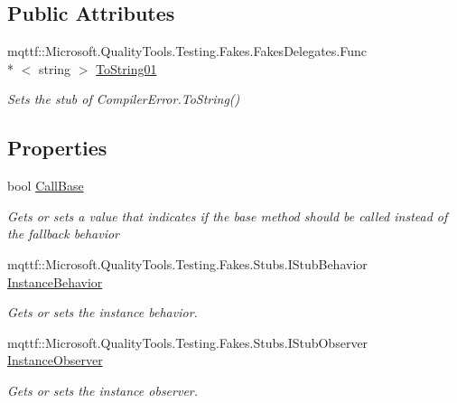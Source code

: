 \subsection*{Public Attributes}
\begin{DoxyCompactItemize}
\item 
mqttf\-::\-Microsoft.\-Quality\-Tools.\-Testing.\-Fakes.\-Fakes\-Delegates.\-Func\\*
$<$ string $>$ \hyperlink{class_system_1_1_code_dom_1_1_compiler_1_1_fakes_1_1_stub_compiler_error_adfee205dce906d7669120c94675a8c4e}{To\-String01}
\begin{DoxyCompactList}\small\item\em Sets the stub of Compiler\-Error.\-To\-String()\end{DoxyCompactList}\end{DoxyCompactItemize}
\subsection*{Properties}
\begin{DoxyCompactItemize}
\item 
bool \hyperlink{class_system_1_1_code_dom_1_1_compiler_1_1_fakes_1_1_stub_compiler_error_aa108fa830ceedfa9322638f34c5fa9ea}{Call\-Base}
\begin{DoxyCompactList}\small\item\em Gets or sets a value that indicates if the base method should be called instead of the fallback behavior\end{DoxyCompactList}\item 
mqttf\-::\-Microsoft.\-Quality\-Tools.\-Testing.\-Fakes.\-Stubs.\-I\-Stub\-Behavior \hyperlink{class_system_1_1_code_dom_1_1_compiler_1_1_fakes_1_1_stub_compiler_error_ab015a97eb6c6c8eb1ee63805430b3a48}{Instance\-Behavior}
\begin{DoxyCompactList}\small\item\em Gets or sets the instance behavior.\end{DoxyCompactList}\item 
mqttf\-::\-Microsoft.\-Quality\-Tools.\-Testing.\-Fakes.\-Stubs.\-I\-Stub\-Observer \hyperlink{class_system_1_1_code_dom_1_1_compiler_1_1_fakes_1_1_stub_compiler_error_a9575bfcbf350f5f2644e31ccb5e450c2}{Instance\-Observer}
\begin{DoxyCompactList}\small\item\em Gets or sets the instance observer.\end{DoxyCompactList}\end{DoxyCompactItemize}


